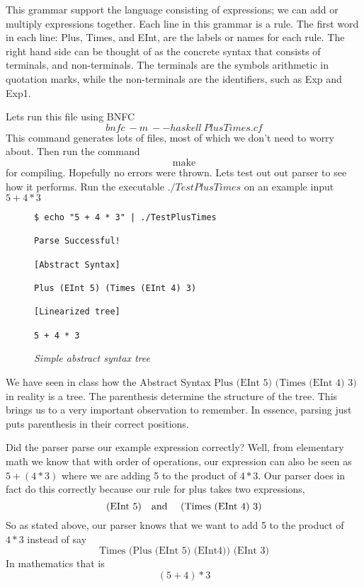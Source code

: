 \documentclass{article}
\begin{document}
\medskip\noindent
This grammar support the language consisting of expressions; we can add or multiply expressions together. Each line in this grammar is a rule. The first word in each line: Plus, Times, and EInt, are the labels or names for each rule. The right hand side can be thought of as the concrete syntax that consists of terminals, and non-terminals. The terminals are the symbols arithmetic in quotation marks, while the non-terminals are the identifiers, such as Exp and Exp1. 

\medskip\noindent
Lets run this file using BNFC $$bnfc \: -m \: --haskell \: PlusTimes.cf$$ This command generates lots of files, most of which we don't need to worry about. Then run the command $$\textrm{make}$$ for compiling. Hopefully no errors were thrown. Lets test out out parser to see how it performs. Run the executable $./TestPlusTimes$ on an example input $ 5 + 4 * 3$

\begin{figure}[H]
    \begin{lstlisting}
$ echo "5 + 4 * 3" | ./TestPlusTimes

Parse Successful!

[Abstract Syntax]

Plus (EInt 5) (Times (EInt 4) 3)

[Linearized tree]

5 + 4 * 3

    \end{lstlisting}
    \caption{\textit{Simple abstract syntax tree}}
\end{figure}

We have seen in class how the Abstract Syntax $\textrm{Plus (EInt 5) (Times (EInt 4) 3)}$ in reality is a tree. The parenthesis determine the structure of the tree. This brings us to a very important observation to remember. In essence, parsing just puts parenthesis in their correct positions. 

\medskip\noindent
Did the parser parse our example expression correctly? Well, from elementary math we know that with order of operations, our expression can also be seen as $5 + (4 * 3)$ where we are adding 5 to the product of $4 * 3$. Our parser does in fact do this correctly because our rule for plus takes two expressions, $$\textrm{(EInt 5)\quad and \quad(Times (EInt 4) 3)}$$ So as stated above, our parser knows that we want to add 5 to the product of $4 * 3$ instead of say $$\textrm{Times (Plus (EInt 5) (EInt4)) (EInt 3)}$$ In mathematics that is $$(5+4) * 3$$
\end{document}
